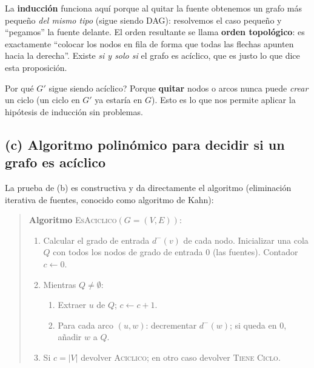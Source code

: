 \documentclass[11pt,a4paper]{article}
\theoremstyle{plain}
\theoremstyle{definition}
\begin{document}
\begin{concepto}
La \textbf{inducci\'on} funciona aqu\'i porque al quitar la fuente obtenemos un grafo
m\'as peque\~no \emph{del mismo tipo} (sigue siendo DAG): resolvemos el caso peque\~no
y ``pegamos'' la fuente delante. El orden resultante se llama \textbf{orden
topol\'ogico}: es exactamente ``colocar los nodos en fila de forma que todas las
flechas apunten hacia la derecha''. Existe \emph{si y solo si} el grafo es ac\'iclico,
que es justo lo que dice esta proposici\'on.
\end{concepto}

\begin{porque}
\textquestiondown{}Por qu\'e $G'$ sigue siendo ac\'iclico? Porque \textbf{quitar} nodos o arcos nunca
puede \emph{crear} un ciclo (un ciclo en $G'$ ya estar\'ia en $G$). Esto es lo que
nos permite aplicar la hip\'otesis de inducci\'on sin problemas.
\end{porque}

\subsection*{(c) Algoritmo polin\'omico para decidir si un grafo es ac\'iclico}

La prueba de (b) es constructiva y da directamente el algoritmo (eliminaci\'on
iterativa de fuentes, conocido como algoritmo de Kahn):

\begin{quote}
\textbf{Algoritmo} \textsc{EsAciclico}$(G=(V,E))$:
\begin{enumerate}[nosep]
  \item Calcular el grado de entrada $d^{-}(v)$ de cada nodo. Inicializar una cola
        $Q$ con todos los nodos de grado de entrada $0$ (las fuentes). Contador
        $c\leftarrow 0$.
  \item Mientras $Q\neq\emptyset$:
        \begin{enumerate}[nosep]
          \item Extraer $u$ de $Q$; $c\leftarrow c+1$.
          \item Para cada arco $(u,w)$: decrementar $d^{-}(w)$; si queda en $0$,
                a\~nadir $w$ a $Q$.
        \end{enumerate}
  \item Si $c=|V|$ devolver \textsc{Aciclico}; en otro caso devolver
        \textsc{Tiene Ciclo}.
\end{enumerate}
\end{quote}
\end{document}
